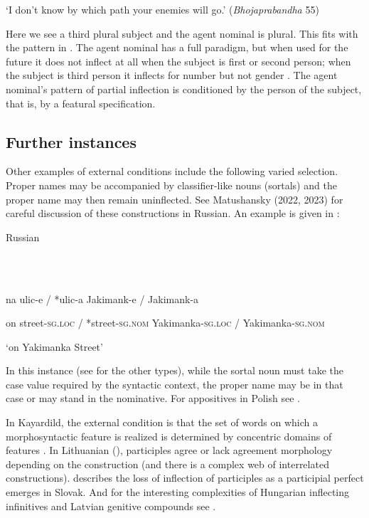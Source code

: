 \documentclass[output=paper]{langscibook}
\begin{document}
  ‘I don’t know by which path your enemies will go.’   (\textit{Bhojaprabandha} 55)

Here we see a third plural subject and the agent nominal is plural. This fits with the pattern in . The agent nominal has a full paradigm, but when used for the future it does not inflect at all when the subject is first or second person; when the subject is third person it inflects for number  but not gender . The agent nominal’s pattern of partial inflection is conditioned by the person of the subject, that is, by a featural specification. 

\subsection{\textbf{Further} \textbf{instances}}

Other examples of external conditions include the following varied selection. Proper names may be accompanied by classifier-like nouns (sortals) and the proper name may then remain uninflected. See Matushansky (2022, 2023) for careful discussion of these constructions in Russian. An example is given in :

Russian \citep[235]{Matushansky2023}

\ea%
    \label{ex:key:18}
    \gll \\
         \\
    \glt
    \z %

          na  ulic-e /   *ulic-a  Jakimank-e /   Jakimank-a 

  on  street-\textsc{sg.loc} /   *street-\textsc{sg.nom}  Yakimanka-\textsc{sg.loc} /  Yakimanka-\textsc{sg.nom} 

‘on Yakimanka Street’

In this instance (see \citealt{Matushansky2023} for the other types), while the sortal noun must take the case value required by the syntactic context, the proper name may be in that case or may stand in the nominative. For appositives in Polish see \citet{Cetnarowska2021}.

In Kayardild, the external condition is that the set of words on which a morphosyntactic feature is realized is determined by concentric domains of features \citep[78-84]{Round2013}. In Lithuanian (\citealt{Arkadiev2013,Arkadiev2020}), participles agree or lack agreement morphology depending on the construction (and there is a complex web of interrelated constructions). \citet{Giger2016} describes the loss of inflection of participles as a participial perfect emerges in Slovak. And for the interesting complexities of Hungarian inflecting infinitives and Latvian genitive compounds see \citet{Spencer2025}.
\end{document}
